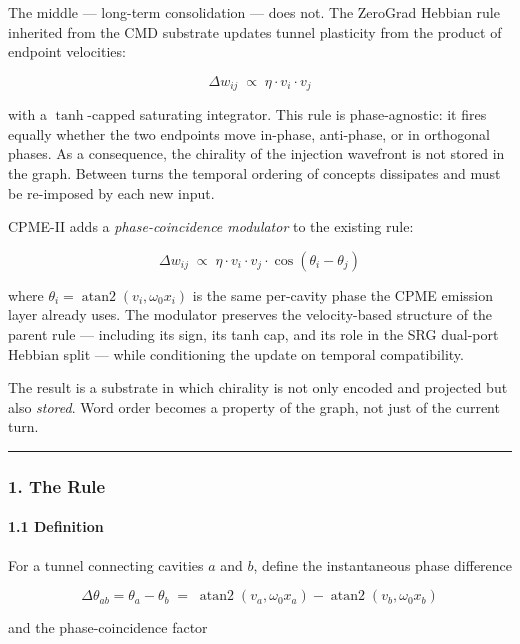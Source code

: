 \documentclass[
  11pt,
  a4paper,
]{article}
\begin{document}
The middle --- long-term consolidation --- does not. The ZeroGrad
Hebbian rule inherited from the CMD substrate updates tunnel plasticity
from the product of endpoint velocities:

\[
\Delta w_{ij} \;\propto\; \eta \cdot v_i \cdot v_j
\]

with a \(\tanh\)-capped saturating integrator. This rule is
phase-agnostic: it fires equally whether the two endpoints move
in-phase, anti-phase, or in orthogonal phases. As a consequence, the
chirality of the injection wavefront is not stored in the graph. Between
turns the temporal ordering of concepts dissipates and must be
re-imposed by each new input.

CPME-II adds a \emph{phase-coincidence modulator} to the existing rule:

\[
\Delta w_{ij} \;\propto\; \eta \cdot v_i \cdot v_j \cdot \cos(\theta_i - \theta_j)
\]

where \(\theta_i = \operatorname{atan2}(v_i, \omega_0 x_i)\) is the same
per-cavity phase the CPME emission layer already uses. The modulator
preserves the velocity-based structure of the parent rule --- including
its sign, its tanh cap, and its role in the SRG dual-port Hebbian split
--- while conditioning the update on temporal compatibility.

The result is a substrate in which chirality is not only encoded and
projected but also \emph{stored}. Word order becomes a property of the
graph, not just of the current turn.

\begin{center}\rule{0.5\linewidth}{0.5pt}\end{center}

\subsubsection{1. The Rule}\label{the-rule}

\paragraph{1.1 Definition}\label{definition}

For a tunnel connecting cavities \(a\) and \(b\), define the
instantaneous phase difference

\[
\Delta \theta_{ab} = \theta_a - \theta_b \;=\; \operatorname{atan2}(v_a, \omega_0 x_a) - \operatorname{atan2}(v_b, \omega_0 x_b)
\]

and the phase-coincidence factor
\end{document}
